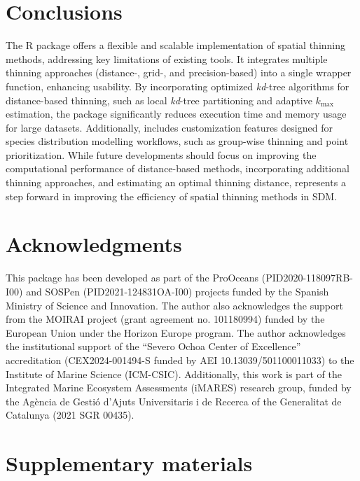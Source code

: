 \section{Conclusions}\label{conclusions}

The  R package offers a flexible and scalable implementation of spatial thinning methods, addressing key limitations of existing tools. It integrates multiple thinning approaches (distance-, grid-, and precision-based) into a single wrapper function, enhancing usability. By incorporating optimized \emph{kd}-tree algorithms for distance-based thinning, such as local \emph{kd}-tree partitioning and adaptive \(k_\text{max}\) estimation, the package significantly reduces execution time and memory usage for large datasets. Additionally,  includes customization features designed for species distribution modelling workflows, such as group-wise thinning and point prioritization. While future developments should focus on improving the computational performance of distance-based methods, incorporating additional thinning approaches, and estimating an optimal thinning distance,  represents a step forward in improving the efficiency of spatial thinning methods in SDM.

\section{Acknowledgments}\label{acknowledgments}

This package has been developed as part of the ProOceans (PID2020-118097RB-I00) and SOSPen (PID2021-124831OA-I00) projects funded by the Spanish Ministry of Science and Innovation. The author also acknowledges the support from the MOIRAI project (grant agreement no. 101180994) funded by the European Union under the Horizon Europe program. The author acknowledges the institutional support of the ``Severo Ochoa Center of Excellence'' accreditation (CEX2024-001494-S funded by AEI 10.13039/501100011033) to the Institute of Marine Science (ICM-CSIC). Additionally, this work is part of the Integrated Marine Ecosystem Assessments (iMARES) research group, funded by the Agència de Gestió d'Ajuts Universitaris i de Recerca of the Generalitat de Catalunya (2021 SGR 00435).

\section{Supplementary materials}\label{supplementary-materials}

